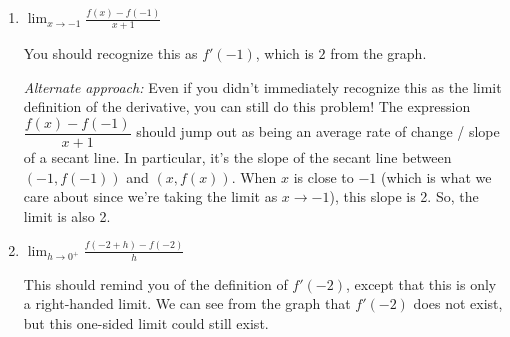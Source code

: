\documentclass{article}
\theoremstyle{theorem}
\begin{document}
\begin{enumerate}
\begin{enumerate}
\begin{enumerate}
      \begin{solution}
        As $t \to 2$, the numerator $\to 3^{-2} = \dfrac{1}{9}$ while the denominator $f(t)$ approaches 0. In this situation, we must think about the sign of the denominator.

        When $t$ is just a bit bigger than $2$, the denominator $f(t)$ is just a little bit less than 0 (while the numerator is close to $\frac{1}{9}$), so $\dfrac{3^{-t}}{f(t)}$ will be very negative. Therefore, $\displaystyle \lim_{t \to 2^+} \frac{3^{-t}}{f(t)} = - \infty$.

        When $t$ is just a bit less than $2$, the denominator $f(t)$ is again just a little bit less than 0 (and the denominator is still close to $\frac{1}{9}$), so $\dfrac{3^{-t}}{f(t)}$ will again be very negative. Therefore, $\displaystyle \lim_{t \to 2^-} \frac{3^{-t}}{f(t)} = - \infty$.

        Therefore, $\displaystyle \lim_{t \to 2} \frac{3^{-t}}{f(t)} = \boxed{-\infty}$.
      \end{solution}

    \item \label{fall2014-1a-midterm1-5b}
      \begin{problem}[\vfill]
        $\displaystyle \lim_{x \to -1} \frac{f(x) - f(-1)}{x + 1}$
      \end{problem}

      \begin{solution}
        You should recognize this as $f'(-1)$, which is $\boxed{2}$ from the graph.

        \emph{Alternate approach:} Even if you didn't immediately recognize this as the limit definition of the derivative, you can still do this problem! The expression \( \dfrac{f(x) - f(-1)}{x + 1}\) should jump out as being an average rate of change / slope of a secant line. In particular, it's the slope of the secant line between \((-1, f(-1))\) and $(x, f(x))$. When $x$ is close to $-1$ (which is what we care about since we're taking the limit as $x \to -1$), this slope is 2. So, the limit is also 2. 
      \end{solution}

    \item
      \begin{problem}[\vfill]
        $\displaystyle \lim_{h \to 0^+} \frac{f(-2 + h) - f(-2)}{h}$
      \end{problem}

      \begin{solution}
        This should remind you of the definition of $f'(-2)$, except that this is only a right-handed limit. We can see from the graph that $f'(-2)$ does not exist, but this one-sided limit could still exist.


\end{solution}
\end{enumerate}
\end{enumerate}
\end{enumerate}
\end{document}
